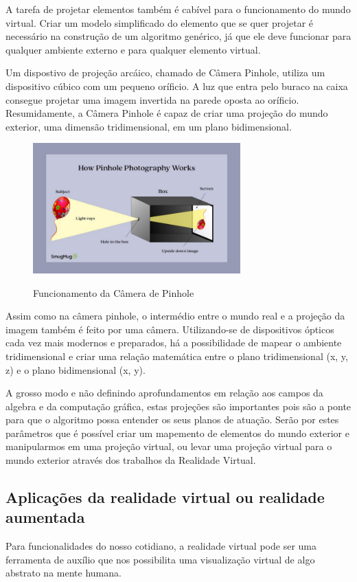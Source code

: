 \documentclass[a4paper, 12pt]{article}
\begin{document}
A tarefa de projetar elementos também é cabível para o funcionamento do mundo virtual. Criar um modelo simplificado do elemento que se quer projetar é necessário na construção de um algoritmo genérico, já que ele deve funcionar para qualquer ambiente externo e para qualquer elemento virtual. 

Um dispostivo de projeção arcáico, chamado de Câmera Pinhole, utiliza um dispositivo cúbico com um pequeno oríficio. A luz que entra pelo buraco na caixa consegue projetar uma imagem invertida na parede oposta ao oríficio. Resumidamente, a Câmera Pinhole é capaz de criar uma projeção do mundo exterior, uma dimensão tridimensional, em um plano bidimensional. 

\begin{figure}[h!]
    \centering
    \includegraphics[width=8cm]{imagens/camera pinhole.jpg}
    \caption{Funcionamento da Câmera de Pinhole}
    \label{fig:my_label}
    \citep{campin}
\end{figure}


Assim como na câmera pinhole, o intermédio entre o mundo real e a projeção da imagem também é feito por uma câmera. Utilizando-se de dispositivos ópticos cada vez mais modernos e preparados, há a possibilidade de mapear o ambiente tridimensional e criar uma relação matemática entre o plano tridimensional (x, y, z) e o plano bidimensional (x, y). 

A grosso modo e não definindo aprofundamentos em relação aos campos da algebra e da computação gráfica, estas projeções são importantes pois são a ponte para que o algoritmo possa entender os seus planos de atuação. Serão por estes parâmetros que é possível criar um mapemento de elementos do mundo exterior e manipularmos em uma projeção virtual, ou levar uma projeção virtual para o mundo exterior através dos trabalhos da Realidade Virtual.

\subsection{Aplicações da realidade virtual ou realidade aumentada}
Para funcionalidades do nosso cotidiano, a realidade virtual pode ser uma ferramenta de auxílio que nos possibilita uma visualização virtual de algo abstrato na mente humana.
\end{document}
